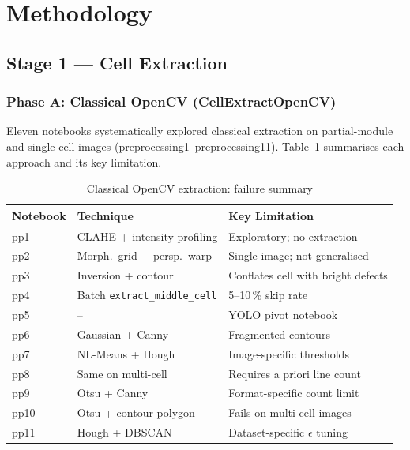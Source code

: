 \documentclass[conference]{IEEEtran}
\begin{document}
\section{Methodology}

\subsection{Stage 1 --- Cell Extraction}
\label{sec:stage1}

\subsubsection{Phase A: Classical OpenCV (CellExtractOpenCV)}

Eleven notebooks systematically explored classical extraction
on partial-module and single-cell images
(preprocessing1--preprocessing11).
Table~\ref{tab:classical_failure} summarises each approach and
its key limitation.

\begin{table}[t]
  \caption{Classical OpenCV extraction: failure summary}
  \label{tab:classical_failure}
  \begin{center}
  \renewcommand{\arraystretch}{1.1}
  \small
  \begin{tabular}{lp{1.9cm}p{2.4cm}}
    \toprule
    \textbf{Notebook} & \textbf{Technique} &
    \textbf{Key Limitation} \\
    \midrule
    pp1  & CLAHE + intensity profiling & Exploratory; no extraction \\
    pp2  & Morph.\ grid + persp.\ warp & Single image; not generalised \\
    pp3  & Inversion + contour & Conflates cell with bright defects \\
    pp4  & Batch \texttt{extract\_middle\_cell} & 5--10\,\% skip rate \\
    pp5  & --                       & YOLO pivot notebook \\
    pp6  & Gaussian + Canny         & Fragmented contours \\
    pp7  & NL-Means + Hough         & Image-specific thresholds \\
    pp8  & Same on multi-cell       & Requires a priori line count \\
    pp9  & Otsu + Canny             & Format-specific count limit \\
    pp10 & Otsu + contour polygon   & Fails on multi-cell images \\
    pp11 & Hough + DBSCAN           & Dataset-specific $\epsilon$ tuning \\
    \bottomrule
  \end{tabular}
  \end{center}
\end{table}
\end{document}

